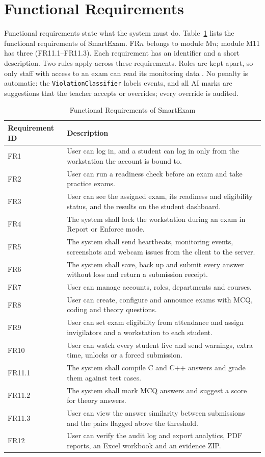 \section{Functional Requirements}
Functional requirements state what the system must do. Table~\ref{tab:functionalrequirements} lists the functional requirements of SmartExam. FR$n$ belongs to module M$n$; module M11 has three (FR11.1--FR11.3). Each requirement has an identifier and a short description. Two rules apply across these requirements. Roles are kept apart, so only staff with access to an exam can read its monitoring data \cite{rbac1}. No penalty is automatic: the \texttt{ViolationClassifier} labels events, and all AI marks are suggestions that the teacher accepts or overrides; every override is audited.

\begin{table}[H]
\centering
\caption{Functional Requirements of SmartExam}
\label{tab:functionalrequirements}
\renewcommand{\arraystretch}{1.2}
\begin{tabularx}{\linewidth}{l>{\raggedright\arraybackslash}X}
\hline\hline
\textbf{Requirement ID} & \textbf{Description} \\
\hline
FR1 & User can log in, and a student can log in only from the workstation the account is bound to. \\
FR2 & User can run a readiness check before an exam and take practice exams. \\
FR3 & User can see the assigned exam, its readiness and eligibility status, and the results on the student dashboard. \\
FR4 & The system shall lock the workstation during an exam in Report or Enforce mode. \\
FR5 & The system shall send heartbeats, monitoring events, screenshots and webcam issues from the client to the server. \\
FR6 & The system shall save, back up and submit every answer without loss and return a submission receipt. \\
FR7 & User can manage accounts, roles, departments and courses. \\
FR8 & User can create, configure and announce exams with MCQ, coding and theory questions. \\
FR9 & User can set exam eligibility from attendance and assign invigilators and a workstation to each student. \\
FR10 & User can watch every student live and send warnings, extra time, unlocks or a forced submission. \\
FR11.1 & The system shall compile C and C++ answers and grade them against test cases. \\
FR11.2 & The system shall mark MCQ answers and suggest a score for theory answers. \\
FR11.3 & User can view the answer similarity between submissions and the pairs flagged above the threshold. \\
FR12 & User can verify the audit log and export analytics, PDF reports, an Excel workbook and an evidence ZIP. \\
\hline\hline
\end{tabularx}
\end{table}

